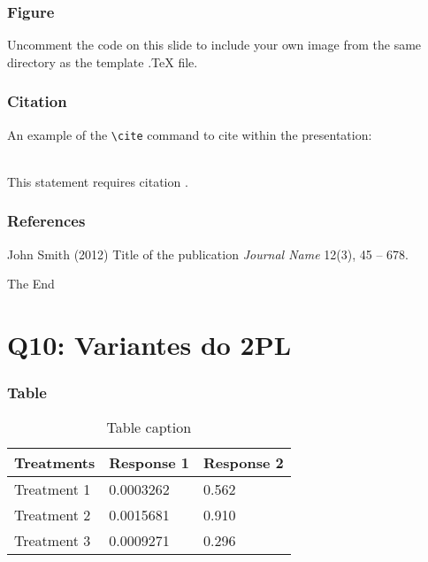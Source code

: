 \documentclass{beamer}
\begin{document}

\begin{frame}
\frametitle{Figure}
Uncomment the code on this slide to include your own image from the same directory as the template .TeX file.
\end{frame}


\begin{frame}[fragile] %
\frametitle{Citation}
An example of the \verb|\cite| command to cite within the presentation:\\~

This statement requires citation \cite{p1}.
\end{frame}


\begin{frame}
\frametitle{References}
\footnotesize{
\begin{thebibliography}{99} %
 John Smith (2012)
\newblock Title of the publication
\newblock \emph{Journal Name} 12(3), 45 -- 678.
\end{thebibliography}
}
\end{frame}


\begin{frame}
\Huge{\centerline{The End}}
\end{frame}


\section{Q10: Variantes do 2PL}

\begin{frame}
\frametitle{Table}
\begin{table}
\begin{tabular}{l l l}
\toprule
\textbf{Treatments} & \textbf{Response 1} & \textbf{Response 2}\\
\midrule
Treatment 1 & 0.0003262 & 0.562 \\
Treatment 2 & 0.0015681 & 0.910 \\
Treatment 3 & 0.0009271 & 0.296 \\
\bottomrule
\end{tabular}
\caption{Table caption}
\end{table}
\end{frame}
\end{document}
